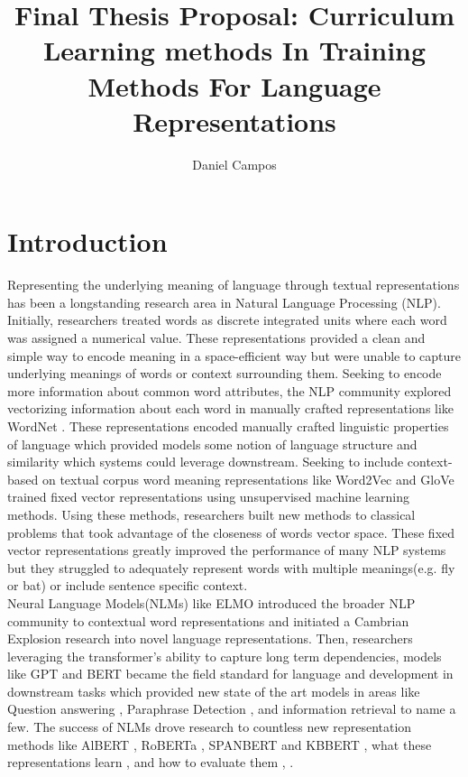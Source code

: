 \documentclass[11pt,a4paper]{article}
\title{Final Thesis Proposal: Curriculum Learning methods In Training Methods For Language Representations}
\author{Daniel Campos}
\begin{document}
\maketitle
\section{Introduction}
Representing the underlying meaning of language through textual representations has been a longstanding research area in Natural Language Processing (NLP). Initially, researchers treated words as discrete integrated units where each word was assigned a numerical value. These representations provided a clean and simple way to encode meaning in a space-efficient way but were unable to capture underlying meanings of words or context surrounding them.  Seeking to encode more information about common word attributes, the NLP community explored vectorizing information about each word in manually crafted representations like WordNet \cite{Miller1992WordNetAL}. These representations encoded manually crafted linguistic properties of language which provided models some notion of language structure and similarity which systems could leverage downstream. Seeking to include context-based on textual corpus word meaning representations like Word2Vec \cite{Mikolov2013EfficientEO} and GloVe \cite{Pennington2014GloveGV} trained fixed vector representations using unsupervised machine learning methods. Using these methods, researchers built new methods to classical problems that took advantage of the closeness of words vector space. These fixed vector representations greatly improved the performance of many NLP systems but they struggled to adequately represent words with multiple meanings(e.g. fly or bat) or include sentence specific context. \\
Neural Language Models(NLMs) like ELMO \cite{Peters2018DeepCW} introduced the broader NLP community to contextual word representations and initiated a Cambrian Explosion research into novel language representations. Then, researchers leveraging the transformer's \cite{Vaswani2017AttentionIA} ability to capture long term dependencies, models like GPT \cite{Radford2018ImprovingLU} and BERT \cite{Devlin2019BERTPO} became the field standard for language and development in downstream tasks which provided new state of the art models in areas like Question answering \cite{Devlin2019BERTPO}, Paraphrase Detection \cite{Wang2018GLUEAM}, and information retrieval \cite{Nogueira2019MultiStageDR} to name a few. The success of NLMs drove research to countless new representation methods like AlBERT \cite{Lan2019ALBERTAL}, RoBERTa \cite{Liu2019RoBERTaAR}, SPANBERT\cite{Joshi2019SpanBERTIP} and KBBERT \cite{Peters2019KnowledgeEC}, what these representations learn \cite{Liu2019LinguisticKA}, \cite{Clark2019WhatDB} and how to evaluate them \cite{Talmor2019oLMpicsO}, \cite{Wang2018GLUEAM}. \\
\end{document}
